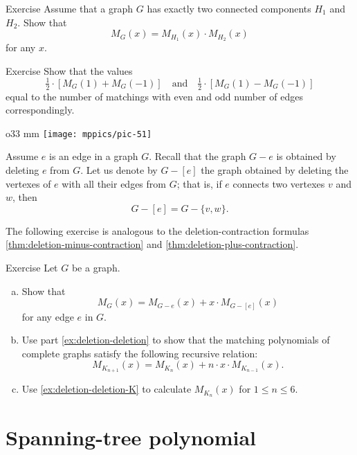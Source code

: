 \begin{thm}{Exercise}
Assume that a graph $G$ has exactly two connected components $H_1$ and $H_2$.
Show that 
\[M_G(x)=M_{H_1}(x)\cdot M_{H_2}(x)\]
for any $x$.
\end{thm}

\begin{thm}{Exercise}
Show that the values
\[\tfrac12\cdot[M_G(1)+ M_G(-1)]\quad\text{and}\quad\tfrac12\cdot[M_G(1)- M_G(-1)]\]
equal to the number of matchings with even and odd number of edges correspondingly.
\end{thm}

{

\begin{wrapfigure}{o}{33 mm}
\vskip-8mm
\centering
\texttt{[image: mppics/pic-51]}
\vskip-0mm
\end{wrapfigure}

Assume $e$ is an edge in a graph $G$.
Recall that the graph $G- e$ is obtained by deleting $e$ from $G$.
Let us denote by $G- [e]$ the graph obtained by deleting the vertexes of $e$ with all their edges from $G$;
that is, if $e$ connects two vertexes $v$ and $w$, then 
\[G- [e]=G- \{v,w\}.\]

}

The following exercise is analogous to the deletion-contraction formulas \ref{thm:deletion-minus-contraction} and \ref{thm:deletion-plus-contraction}.

\begin{thm}{Exercise}\label{ex:deletion-deletion-total}
Let $G$ be a graph.
\begin{enumerate}[(a)]
\item\label{ex:deletion-deletion} Show that
\[M_G(x)=M_{G- e}(x)+x\cdot M_{G- [e]}(x)\]
for any edge $e$ in $G$.

\item\label{ex:deletion-deletion-K} Use part \ref{ex:deletion-deletion} to show that the matching polynomials of complete graphs satisfy the following recursive relation:
\[M_{K_{n+1}}(x)=M_{K_{n}}(x)+n\cdot x\cdot M_{K_{n-1}}(x).\]

\item Use \ref{ex:deletion-deletion-K} to calculate $M_{K_n}(x)$ for $1\le n\le 6$.
\end{enumerate}

\end{thm}

\section*{Spanning-tree polynomial}

